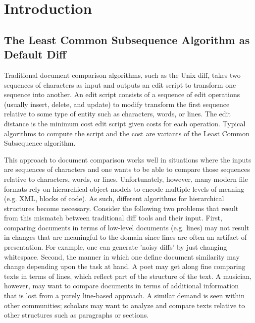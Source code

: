\documentclass{article}
\title{\papertitle}
\begin{document}
%
\capstartfalse
\maketitle
\capstarttrue
%
\begin{abstract}
We describe an initial approach to hierarchic diff for collaborative music document editing via tree-based music representations, using Zhang and Shasha's tree edit distance
algorithm as implemented within the XUDiff tool.  The edit distance
between two trees is the minimum number of edit operations necessary
to transform one tree into another.  We consider common operations on the score tree -- deleting, changing, and appending tree nodes -- to derive a minimal edit sequence, known as an edit script.
\end{abstract}
%

\section{Introduction}\label{sec:introduction}
\subsection{The Least Common Subsequence Algorithm as Default Diff}
Traditional document comparison algorithms, such as the Unix diff,
takes two sequences of characters as input and outputs an edit script
to transform one sequence into another.  An edit script consists of a
sequence of edit operations (usually insert, delete, and update) to
modify transform the first sequence relative to some type of entity
such as characters, words, or lines.  The edit distance is the minimum
cost edit script given costs for each operation.  Typical algorithms
to compute the script and the cost are variants of the Least Common
Subsequence algorithm.  


This approach to document comparison works well in situations where
the inputs are sequences of characters and one wants to be
able to compare those sequences relative to characters, words, or
lines.  Unfortunately, however, many modern file formats rely on
hierarchical object models to encode multiple levels of meaning
(e.g. XML, blocks of code).  As such, different algorithms for
hierarchical structures become necessary.  Consider the following two
problems that result from this mismatch between traditional diff tools
and their input.  First, comparing documents in terms of low-level
documents (e.g. lines) may not result in changes that are meaningful
to the domain since lines are often an artifact of presentation.  For
example, one can generate 'noisy diffs' by just changing whitespace.
Second, the manner in which one define document similarity may change
depending upon the task at hand.  A poet may get along fine comparing
texts in terms of lines, which reflect part of the structure of the
text.  A musician, however, may want to compare documents in terms of
additional information that is lost from a purely line-based
approach.  A similar demand is seen within other communities; scholars
may want to analyze and compare texts relative to other structures
such as paragraphs or sections.
\end{document}
